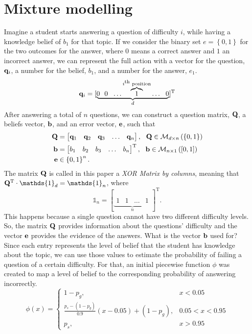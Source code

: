 \documentclass{article}
\newcommand{\0}{\mathbbold{0}}
\newcommand{\1}{\mathds{1}}
\newcommand{\2}{\mathbbold{2}}
\newcommand{\T}{^{\operatorname{T}}}
\begin{document}
\section{Mixture modelling}
Imagine a student starts answering a question of difficulty $i$, while having a knowledge belief of $b_1$ for that topic.
If we consider the binary set $e = \left\{0,1\right\}$ for the two outcomes for the answer, where $0$ means a correct answer and $1$ an incorrect answer,
we can represent the full action with a vector for the question, ${\bf q}_i$, a number for the belief, $b_1$, and a number for the answer, $e_1$.
\[ {\bf q}_i = [\underbrace{0 ~~ 0 ~~ \hdots \overbrace{1}^{i\textsuperscript{th}\text{ position}} \hdots ~~ 0}_d]\T \]
After answering a total of $n$ questions, we can construct a question matrix, ${\bf Q}$, a beliefs vector, ${\bf b}$, and an error vector, ${\bf e}$, such that
\begin{align*}
    {\bf Q} &= \begin{bmatrix}
        {\bf q}_1 & {\bf q}_2 & {\bf q}_3 & \hdots & {\bf q}_n
    \end{bmatrix}, ~~ {\bf Q} \in \mathcal{M}_{d\times n}\left(\left\{0,1\right\}\right) \\
    {\bf b} &= \begin{bmatrix}
        b_1 & b_2 & b_3 & \hdots & b_n
    \end{bmatrix}\T, ~~ {\bf b} \in \mathcal{M}_{n\times 1}\left([0,1]\right) \\
    {\bf e} &\in \left\{0,1\right\}^n.
\end{align*}
The matrix ${\bf Q}$ is called in this paper a \textsl{XOR Matrix by columns}, meaning that ${\bf Q}\T \cdot \1_d = \1_n$, where
$$ \1_n = [\underbrace{\begin{matrix}
        1 & 1 & \hdots & 1
    \end{matrix}}_n]\T. $$
This happens because a single question cannot have two different difficulty levels.
So, the matrix ${\bf Q}$ provides information about the questions' difficulty and the vector ${\bf e}$ provides the evidence of the answers.
What is the vector ${\bf b}$ used for? Since each entry represents the level of belief that the student has knowledge about the topic,
we can use those values to estimate the probability of failing a question of a certain difficulty.
For that, an initial piecewise function $\phi$ was created to map a level of belief to the corresponding probability of answering incorrectly.
$$ \phi(x) = \begin{cases*}
    1 - p_g, & x < 0.05 \\
    \frac{p_s - (1 - p_g)}{0.9}(x - 0.05) + (1 - p_g), & 0.05 < x < 0.95 \\
    p_s, & x > 0.95 
\end{cases*} $$
\end{document}
